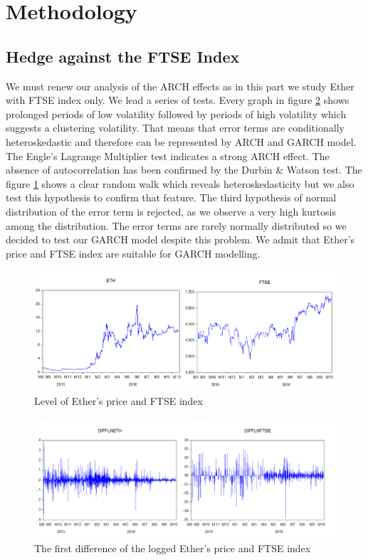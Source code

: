 \documentclass[11pt]{report}
\begin{document}
\clearpage	
	\section{Methodology}
	\subsection*{Hedge against the FTSE Index}
	
We must renew our analysis of the ARCH effects as in this part we study Ether with FTSE index only. We lead a series of tests. Every graph in figure \ref{FIG32} shows prolonged periods of low volatility followed by periods of high volatility which suggests a clustering volatility. That means that error terms are conditionally heteroskedastic and therefore can be represented by ARCH and GARCH model. The Engle’s Lagrange Multiplier test indicates a strong ARCH effect. The absence of autocorrelation has been confirmed by the Durbin \& Watson test. The figure \ref{FIG31} shows a clear random walk which reveals heteroskedasticity but we also test this hypothesis to confirm that feature. The third hypothesis of normal distribution of the error term is rejected, as we observe a very high kurtosis among the distribution. The error terms are rarely normally distributed so we decided to test our GARCH model despite this problem. We admit that Ether’s price and FTSE index are suitable for GARCH modelling. 	
\medbreak
\begin{figure}[!h]
\caption{Level of Ether’s price and FTSE index}
\centerline{\includegraphics[scale=0.7]{Chap3/Figure1}}
\label{FIG31}
\end{figure}
\medbreak
\begin{figure}[!h]
\caption{The first difference of the logged Ether’s price and FTSE index}
\centerline{\includegraphics{Chap3/Figure2}}
\label{FIG32}
\end{figure}
\clearpage
\end{document}
